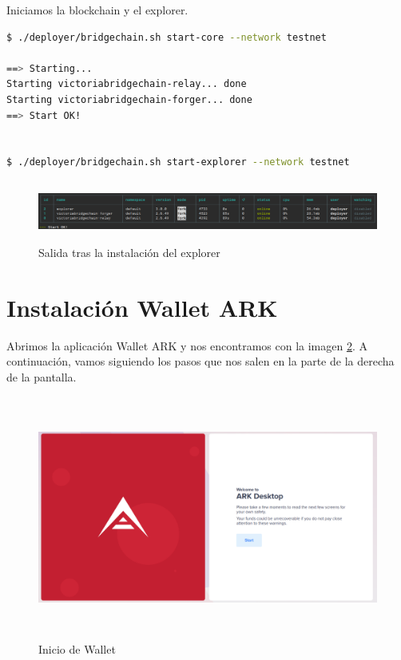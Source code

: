 Iniciamos la blockchain y el explorer.\\

\begin{lstlisting}[language=Bash,caption=Instalación Blockchain. Parte XII, label=cod:suma-cuerpo, style=Consola]
$ ./deployer/bridgechain.sh start-core --network testnet

==> Starting...
Starting victoriabridgechain-relay... done
Starting victoriabridgechain-forger... done
==> Start OK!


$ ./deployer/bridgechain.sh start-explorer --network testnet
\end{lstlisting}

\begin{figure}[h]
	\centering
	\includegraphics[width=14.5cm,height=2cm]{figuras/Instalacion_explorer.png}
	\caption{Salida tras la instalación del explorer}
	\label{fig:install-explorer}
\end{figure}

\section{Instalación Wallet ARK}

Abrimos la aplicación Wallet ARK y nos encontramos con la imagen \ref{fig:wallet-1}. A continuación, vamos siguiendo los pasos que nos salen en la parte de la derecha de la pantalla.

\begin{figure}[h]
	\centering
	\includegraphics[width=14.5cm,height=8cm]{figuras/wallet_1.png}
	\caption{Inicio de Wallet}
	\label{fig:wallet-1}
\end{figure}


